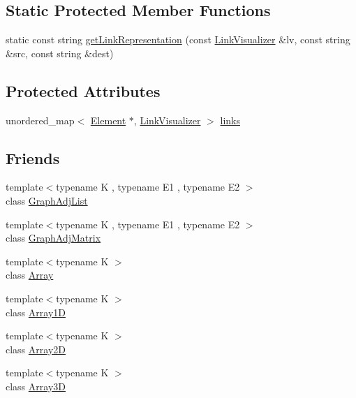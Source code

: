 \subsection*{Static Protected Member Functions}
\begin{DoxyCompactItemize}
\item 
static const string \hyperlink{classbridges_1_1datastructure_1_1_element_a0d43c0aaa96192b49dfc0a499d63a325}{get\+Link\+Representation} (const \hyperlink{classbridges_1_1datastructure_1_1_link_visualizer}{Link\+Visualizer} \&lv, const string \&src, const string \&dest)
\end{DoxyCompactItemize}
\subsection*{Protected Attributes}
\begin{DoxyCompactItemize}
\item 
unordered\+\_\+map$<$ \hyperlink{classbridges_1_1datastructure_1_1_element}{Element} $\ast$, \hyperlink{classbridges_1_1datastructure_1_1_link_visualizer}{Link\+Visualizer} $>$ \hyperlink{classbridges_1_1datastructure_1_1_element_ac296ae66e6b04e95f31f4134228524f8}{links}
\end{DoxyCompactItemize}
\subsection*{Friends}
\begin{DoxyCompactItemize}
\item 
{\footnotesize template$<$typename K , typename E1 , typename E2 $>$ }\\class \hyperlink{classbridges_1_1datastructure_1_1_element_a65850138f0763fec43a76fb942f0eccc}{Graph\+Adj\+List}
\item 
{\footnotesize template$<$typename K , typename E1 , typename E2 $>$ }\\class \hyperlink{classbridges_1_1datastructure_1_1_element_a1935808473b7eb8ff54149c5436c3ac9}{Graph\+Adj\+Matrix}
\item 
{\footnotesize template$<$typename K $>$ }\\class \hyperlink{classbridges_1_1datastructure_1_1_element_ab1a595168ea1870ce436dfd2d8e69b6d}{Array}
\item 
{\footnotesize template$<$typename K $>$ }\\class \hyperlink{classbridges_1_1datastructure_1_1_element_a71a2fa1cdcc1e193c1790c39b8267780}{Array1D}
\item 
{\footnotesize template$<$typename K $>$ }\\class \hyperlink{classbridges_1_1datastructure_1_1_element_a335c96c00a46d6b064b5af268ae03e42}{Array2D}
\item 
{\footnotesize template$<$typename K $>$ }\\class \hyperlink{classbridges_1_1datastructure_1_1_element_a2adb97d98cc3a6fe0cd1daaf40058938}{Array3D}
\end{DoxyCompactItemize}


